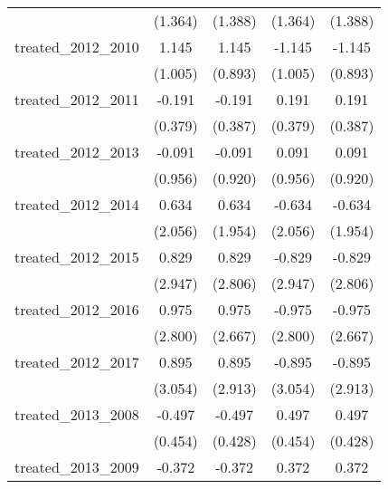 {\begin{tabular}{l*{4}{c}}
            &     (1.364)         &     (1.388)         &     (1.364)         &     (1.388)         \\
[1em]
treated\_2012\_2010&       1.145         &       1.145         &      -1.145         &      -1.145         \\
            &     (1.005)         &     (0.893)         &     (1.005)         &     (0.893)         \\
[1em]
treated\_2012\_2011&      -0.191         &      -0.191         &       0.191         &       0.191         \\
            &     (0.379)         &     (0.387)         &     (0.379)         &     (0.387)         \\
[1em]
treated\_2012\_2013&      -0.091         &      -0.091         &       0.091         &       0.091         \\
            &     (0.956)         &     (0.920)         &     (0.956)         &     (0.920)         \\
[1em]
treated\_2012\_2014&       0.634         &       0.634         &      -0.634         &      -0.634         \\
            &     (2.056)         &     (1.954)         &     (2.056)         &     (1.954)         \\
[1em]
treated\_2012\_2015&       0.829         &       0.829         &      -0.829         &      -0.829         \\
            &     (2.947)         &     (2.806)         &     (2.947)         &     (2.806)         \\
[1em]
treated\_2012\_2016&       0.975         &       0.975         &      -0.975         &      -0.975         \\
            &     (2.800)         &     (2.667)         &     (2.800)         &     (2.667)         \\
[1em]
treated\_2012\_2017&       0.895         &       0.895         &      -0.895         &      -0.895         \\
            &     (3.054)         &     (2.913)         &     (3.054)         &     (2.913)         \\
[1em]
treated\_2013\_2008&      -0.497         &      -0.497         &       0.497         &       0.497         \\
            &     (0.454)         &     (0.428)         &     (0.454)         &     (0.428)         \\
[1em]
treated\_2013\_2009&      -0.372         &      -0.372         &       0.372         &       0.372         \\

\end{tabular}}
